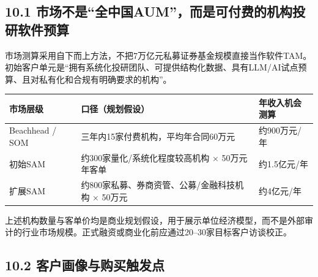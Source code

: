\documentclass[12pt,a4paper]{ctexart}
\begin{document}
\subsection{\texorpdfstring{\textbf{10.1
市场不是``全中国AUM''，而是可付费的机构投研软件预算}}{10.1 市场不是``全中国AUM''，而是可付费的机构投研软件预算}}\label{ux5e02ux573aux4e0dux662fux5168ux4e2dux56fdaumux800cux662fux53efux4ed8ux8d39ux7684ux673aux6784ux6295ux7814ux8f6fux4ef6ux9884ux7b97}

市场测算采用自下而上方法，不把7万亿元私募证券基金规模直接当作软件TAM。初始客户单元是``拥有系统化投研团队、可提供结构化数据、具有LLM/AI试点预算、且对私有化和合规有明确要求的机构''。

\begin{longtable}[]{@{}
  >{\raggedright\arraybackslash}p{}
  >{\raggedright\arraybackslash}p{}
  >{\raggedright\arraybackslash}p{}@{}}
\toprule\noalign{}
\begin{minipage}[b]{\linewidth}\centering
\textbf{市场层级}
\end{minipage} & \begin{minipage}[b]{\linewidth}\centering
\textbf{口径（规划假设）}
\end{minipage} & \begin{minipage}[b]{\linewidth}\centering
\textbf{年收入机会测算}
\end{minipage} \\
\midrule\noalign{}
\endhead
\bottomrule\noalign{}
\endlastfoot
Beachhead / SOM & 三年内15家付费机构，平均年合同60万元 & 约900万元/年 \\
初始SAM & 约300家量化/系统化程度较高机构 × 50万元年客单 &
约1.5亿元/年 \\
扩展SAM & 约800家私募、券商资管、公募/金融科技机构 × 50万元 &
约4亿元/年 \\
\end{longtable}

上述机构数量与客单价均是商业规划假设，用于展示单位经济模型，而不是外部审计的行业市场规模。正式融资或商业化前应通过20--30家目标客户访谈校正。

\subsection{\texorpdfstring{\textbf{10.2
客户画像与购买触发点}}{10.2 客户画像与购买触发点}}\label{ux5ba2ux6237ux753bux50cfux4e0eux8d2dux4e70ux89e6ux53d1ux70b9}
\end{document}

